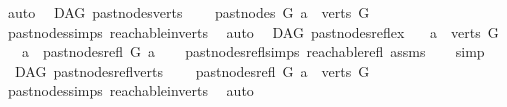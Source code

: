 \begin{isabellebody}
\ auto%
\endisatagproof
{\isafoldproof}%
%
\isadelimproof
\isanewline
%
\endisadelimproof
\isanewline
{}\isamarkupfalse%
\ {\isacharparenleft}{\kern0pt}\ DAG{\isacharparenright}{\kern0pt}\ past{\isacharunderscore}{\kern0pt}nodes{\isacharunderscore}{\kern0pt}verts{\isacharcolon}{\kern0pt}\ \isanewline
\ \ \ {\isachardoublequoteopen}past{\isacharunderscore}{\kern0pt}nodes\ G\ a\ {\isasymsubseteq}\ verts\ G{\isachardoublequoteclose}\isanewline
%
\isadelimproof
\ \ %
\endisadelimproof
%
\isatagproof
{}\isamarkupfalse%
\ past{\isacharunderscore}{\kern0pt}nodes{\isachardot}{\kern0pt}simps\ reachable{}{\isacharunderscore}{\kern0pt}in{\isacharunderscore}{\kern0pt}verts\ \isamarkupfalse%
\ auto%
\endisatagproof
{\isafoldproof}%
%
\isadelimproof
\isanewline
%
\endisadelimproof
\isanewline
{}\isamarkupfalse%
\ {\isacharparenleft}{\kern0pt}\ DAG{\isacharparenright}{\kern0pt}\ past{\isacharunderscore}{\kern0pt}nodes{\isacharunderscore}{\kern0pt}refl{\isacharunderscore}{\kern0pt}ex{\isacharcolon}{\kern0pt}\isanewline
\ \ \ {\isachardoublequoteopen}a\ {\isasymin}\ verts\ G{\isachardoublequoteclose}\isanewline
\ \ \ {\isachardoublequoteopen}a\ {\isasymin}\ past{\isacharunderscore}{\kern0pt}nodes{\isacharunderscore}{\kern0pt}refl\ G\ a{\isachardoublequoteclose}\isanewline
%
\isadelimproof
\ \ %
\endisadelimproof
%
\isatagproof
{}\isamarkupfalse%
\ past{\isacharunderscore}{\kern0pt}nodes{\isacharunderscore}{\kern0pt}refl{\isachardot}{\kern0pt}simps\ reachable{\isacharunderscore}{\kern0pt}refl\ assms\isanewline
\ \ \isamarkupfalse%
\ simp%
\endisatagproof
{\isafoldproof}%
%
\isadelimproof
\isanewline
%
\endisadelimproof
\isanewline
{}\isamarkupfalse%
\ {\isacharparenleft}{\kern0pt}\ DAG{\isacharparenright}{\kern0pt}\ past{\isacharunderscore}{\kern0pt}nodes{\isacharunderscore}{\kern0pt}refl{\isacharunderscore}{\kern0pt}verts{\isacharcolon}{\kern0pt}\ \isanewline
\ \ \ {\isachardoublequoteopen}past{\isacharunderscore}{\kern0pt}nodes{\isacharunderscore}{\kern0pt}refl\ G\ a\ {\isasymsubseteq}\ verts\ G{\isachardoublequoteclose}\isanewline
%
\isadelimproof
\ \ %
\endisadelimproof
%
\isatagproof
{}\isamarkupfalse%
\ past{\isacharunderscore}{\kern0pt}nodes{\isachardot}{\kern0pt}simps\ reachable{\isacharunderscore}{\kern0pt}in{\isacharunderscore}{\kern0pt}verts\ \isamarkupfalse%
\ auto%
\endisatagproof
{\isafoldproof}%

\end{isabellebody}
